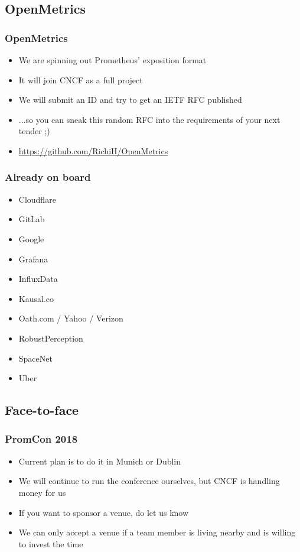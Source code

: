 \documentclass[t]{beamer}
\begin{document}
\subsection{OpenMetrics}

\begin{frame}
	\frametitle{OpenMetrics}
	\begin{itemize}
		\item We are spinning out Prometheus' exposition format
		\item It will join CNCF as a full project
		\item We will submit an ID and try to get an IETF RFC published
		\item ...so you can sneak this random RFC into the requirements of your next tender ;)
		\item \url{https://github.com/RichiH/OpenMetrics}
	\end{itemize}
\end{frame}

\begin{frame}
	\frametitle{Already on board}
	\begin{itemize}
		\item Cloudflare
		\item GitLab
		\item Google
		\item Grafana
		\item InfluxData
		\item Kausal.co
		\item Oath.com / Yahoo / Verizon
		\item RobustPerception
		\item SpaceNet
		\item Uber
	\end{itemize}
\end{frame}


\subsection{Face-to-face}

\begin{frame}
	\frametitle{PromCon 2018}
	\begin{itemize}
		\item Current plan is to do it in Munich or Dublin
		\item We will continue to run the conference ourselves, but CNCF is handling money for us
		\item If you want to sponsor a venue, do let us know
		\item We can only accept a venue if a team member is living nearby and is willing to invest the time
	\end{itemize}
\end{frame}
\end{document}
